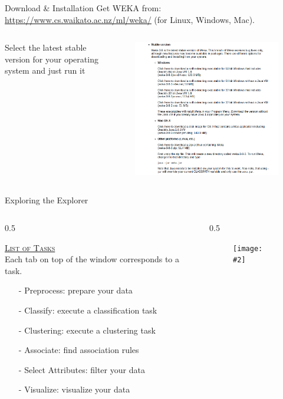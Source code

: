 \documentclass{beamer}
\newcommand{\cblue}[1]{{\usebeamercolor[fg]{structure} #1}}
\newcommand{\cols}[4]{
	\begin{columns}[t]
	\begin{column}{#1\textwidth}
		#3
	\end{column}
	\begin{column}{#2\textwidth}
		#4
	\end{column}
	\end{columns}
	
}
\newcommand{\fig}[2]{
	\begin{figure}[!h]
	\texttt{[image: \#2]}
	\end{figure}
}
\begin{document}
\begin{frame}{Download \& Installation}
Get WEKA from: \underline{\url{https://www.cs.waikato.ac.nz/ml/weka/}} 
(for Linux, Windows, Mac).
\vskip 10pt
\begin{columns}
\begin{column}{0.4\textwidth}
Select the latest stable version for your operating system and just run it
\end{column}
\begin{column}{0.7\textwidth}
\begin{figure}
\includegraphics[scale=0.23]{img/download.png}
\end{figure}
\end{column}
\end{columns}
\end{frame}



\begin{frame}{Exploring the Explorer}
\cols{0.5}{0.5}{
 \cblue{\underline{\textsc{List of Tasks}}}\\
 Each tab on top of the window corresponds to a task.
 \begin{itemize}
 	\item[-] Preprocess: prepare your data
 	\item[-] Classify: execute a classification task
 	\item[-] Clustering: execute a clustering task
 	\item[-] Associate: find association rules
 	\item[-] Select Attributes: filter your data
 	\item[-] Visualize: visualize your data
 \end{itemize}
}
{
\fig{0.16}{img/tasks.png}
}
\end{frame}
\end{document}
